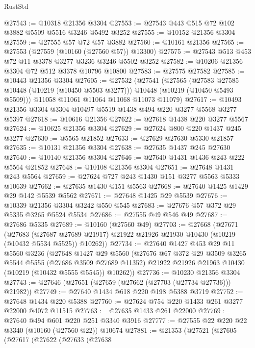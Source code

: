 \begin{lexlean}{RustStd}
\begin{coremodule}
@27543 := @10318 @21356 @3304
@27553 := @27543 @443 @515 @72 @102 @3882 @5509 @5516 @3246 @5492 @3252
@27555 := @10152 @21356 @3304
@27559 := @27555 @57 @72 @57 @3882
@27560 := @10161 @21356
@27565 := @27553 (@27559 (@10160 (@27560 @57)) @13300)
@27575 := @27543 @513 @453 @72 @11 @3378 @3277 @3236 @3246 @5502 @3252
@27582 := @10206 @21356 @3304 @72 @512 @3378 @10796 @10800
@27583 := @27575 @27582
@27585 := @10443 @21356 @3304
@27605 := @27532
    (@27541
      (@27565
        (@27583 @27585 @10448 (@10219 (@10450 @5503 @3277)))
        @10448
        (@10219 (@10450 @5493 @5509)))
      @11058
      @11061
      @11064
      @11068
      @11073
      @11079)
@27617 := @10493 @21356 @3304 @3304 @10497 @5519 @1438 @494 @220 @3277 @5568 @3277 @5397
@27618 := @10616 @21356
@27622 := @27618 @1438 @220 @3277 @5567
@27624 := @10625 @21356 @3304
@27629 := @27624 @800 @220 @1437 @245 @3277
@27630 := @5565 @21852
@27633 := @27629 @27630 @5330 @21857
@27635 := @10131 @21356 @3304
@27638 := @27635 @1437 @245 @27630
@27640 := @10140 @21356 @3304
@27646 := @27640 @1431 @1436 @243 @222 @5564 @21852
@27648 := @10108 @21356 @3304
@27651 := @27648 @1431 @243 @5564
@27659 := @27624 @727 @243 @1430 @151 @3277 @5563 @5333 @10639
@27662 := @27635 @1430 @151 @5563
@27668 := @27640 @1425 @1429 @29 @142 @5539 @5562
@27671 := @27648 @1425 @29 @5539
@27676 := @10339 @21356 @3304 @3242 @550 @545
@27683 := @27676 @57 @372 @29 @5335 @3265 @5524 @5534
@27686 := @27555 @49 @546 @49
@27687 := @27686 @5335
@27689 := @10160 (@27560 @49)
@27703 := @27668
    (@27671
      (@27683
        (@27687 @27689 @21917)
        @21922
        @21926
        @21930
        @10430
        (@10219 (@10432 @5534 @5525))
        @10262))
@27734 := @27640
    @1427
    @453
    @29
    @11
    @5560
    @3236
    (@27648
      @1427
      @29
      @5560
      (@27676
        @67
        @372
        @29
        @3509
        @3265
        @5544
        @5555
        (@27686 @3509 @27689 @11352)
        @21922
        @21926
        @21963
        @10430
        (@10219 (@10432 @5555 @5545))
        @10262))
@27736 := @10230 @21356 @3304
@27743 := @27646 (@27651 (@27659 (@27662 (@27703 (@27734 @27736))) @21982))
@27749 := @27640 @1434 @618 @220 @198 @5388 @3719
@27752 := @27648 @1434 @220 @5388
@27760 := @27624 @754 @220 @1433 @261 @3277 @22000 @4072 @11515
@27763 := @27635 @1433 @261 @22000
@27769 := @27640 @494 @601 @220 @251 @3340 @3916
@27777 := @27555 @22 @220 @22 @3340 (@10160 (@27560 @22)) @10674
@27881 := @21353
    (@27521
      (@27605
        (@27617
          (@27622
            (@27633
              (@27638

\end{coremodule}
\end{lexlean}
